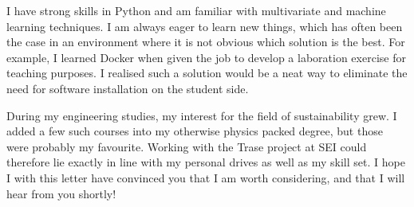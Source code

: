 \documentclass[11pt, a4paper]{../awesome-cv} %
\begin{document}
\begin{cvletter}
I have strong skills in Python and am familiar with multivariate and machine learning techniques.
I am always eager to learn new things, which has often been the case in an environment where it is not obvious which solution is the best.
For example, I learned Docker when given the job to develop a laboration exercise for teaching purposes. 
I realised such a solution would be a neat way to eliminate the need for software installation on the student side.

During my engineering studies, my interest for the field of sustainability grew.
I added a few such courses into my otherwise physics packed degree, but those were probably my favourite. 
Working with the Trase project at SEI could therefore lie exactly in line with my personal drives as well as my skill set.
I hope I with this letter have convinced you that I am worth considering, and that I will hear from you shortly!

\end{cvletter}


\makeletterclosing %
\end{document}
